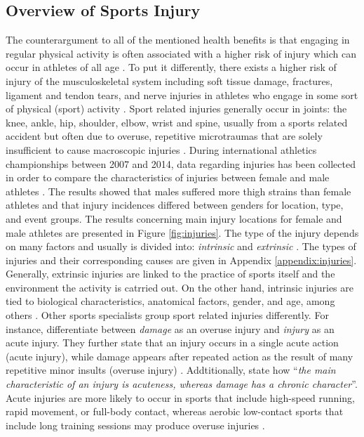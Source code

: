 \subsection{Overview of Sports Injury}\label{subsection:injury}
The counterargument to all of the mentioned health benefits is that engaging in regular physical activity is often associated with a higher risk of injury which can occur in athletes of all age \cite{van1997severity}. To put it differently, there exists a higher risk of injury of the musculoskeletal system including soft tissue
damage, fractures, ligament and tendon tears, and nerve injuries in athletes who engage in some sort of physical (sport) activity \cite{mayr2015prevention}. Sport related injuries generally occur in joints: the knee, ankle, hip, shoulder, elbow, wrist and spine, usually from a sports related accident but often due to overuse, repetitive microtraumas that are solely insufficient to cause macroscopic injuries
 \cite{mayr2015prevention}. During international athletics championships between 2007 and 2014, data regarding injuries has been collected in order to compare the characteristics of injuries between female and male athletes \cite{edouard2015sex}. The results showed that males suffered more thigh strains than female athletes and that injury incidences differed between genders for location, type, and event groups. The results concerning main injury locations for female and male athletes are presented in Figure \ref{fig:injuries}. The type of the injury depends on many factors and usually is divided into: \textit{intrinsic} and \textit{extrinsic} \cite{mayr2015prevention, lefevre2016major}. The types of injuries and their corresponding causes are given in Appendix \ref{appendix:injuries}.\\ Generally, extrinsic injuries are linked to the practice of sports itself and the environment the activity is catrried out. On the other hand, intrinsic injuries are tied to biological characteristics, anatomical factors, gender, and age, among others \cite{mayr2015prevention}. Other sports specialists group sport related injuries differently. For instance, \cite{fischer2016causes} differentiate between \textit{damage} as an overuse injury and \textit{injury} as an acute injury. They further state that an injury occurs in a single acute action (acute injury), while damage appears after repeated action as the result of many repetitive minor insults (overuse injury) \cite{fischer2016causes}. Addtitionally, \cite{pecina1993overuse} state how ``\textit{the main characteristic of an injury is acuteness, whereas damage has a chronic character}''. Acute injuries are more likely to occur in sports that include high-speed running, rapid movement, or full-body contact, whereas aerobic low-contact sports that include long training sessions may produce overuse injuries  \cite{mayr2015prevention}.
